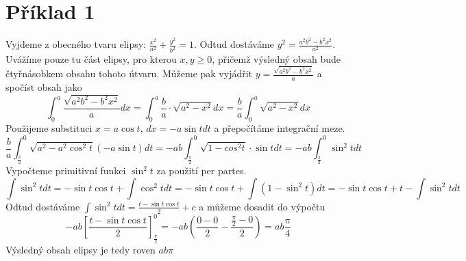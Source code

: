 \documentclass[11pt,a4paper]{article}
\begin{document}
\section*{Příklad 1}
Vyjdeme z obecného tvaru elipsy: $\frac{x^2}{a^2}+\frac{y^2}{b^2} = 1$. Odtud dostáváme $y^2 = \frac{a^2b^2 - b^2x^2}{a^2}$. Uvážíme pouze tu část elipsy, pro kterou $x, y \geq 0$, přičemž výsledný obsah bude čtyřnásobkem obsahu tohoto útvaru. Můžeme pak vyjádřit $y = \frac{\sqrt{a^2b^2-b^2x^2}}{a}$ a spočíst obsah jako
\begin{equation*}
\int_0^a \frac{\sqrt{a^2b^2-b^2x^2}}{a} dx =
\int_0^a \frac{b}{a} \cdot \sqrt{a^2-x^2} dx =
\frac{b}{a} \int_0^a \sqrt{a^2-x^2} dx 
\end{equation*}
Použijeme substituci $x = a\cos t$, $dx = -a\sin t dt$ a přepočítáme integrační meze.
\begin{equation*}
\frac{b}{a} \int_\frac{\pi}{2}^0 \sqrt{a^2-a^2\cos^2 t}(-a\sin t) dt = 
-ab \int_\frac{\pi}{2}^0 \sqrt{1-cos^2 t} \cdot \sin t dt = 
-ab \int_\frac{\pi}{2}^0 \sin^2 t dt
\end{equation*}
Vypočteme primitivní funkci $\sin^2 t$ za použití per partes.
\begin{equation*}
\int \sin^2t dt = -\sin t \cos t + \int \cos^2 t dt = 
-\sin t \cos t + \int (1-\sin^2 t) dt = -\sin t \cos t + t - \int \sin^2 t dt
\end{equation*}
Odtud dostáváme $\int \sin^2 t dt = \frac{t-\sin t \cos t}{2} + c$ a můžeme dosadit do výpočtu
\begin{equation*}
-ab \left[\frac{t-\sin t \cos t}{2}\right]_\frac{\pi}{2}^0 =
-ab \left(\frac{0-0}{2} - \frac{\frac{\pi}{2}-0}{2}\right) =
ab\frac{\pi}{4}
\end{equation*} 
Výsledný obsah elipsy je tedy roven $ab\pi$
\end{document}
